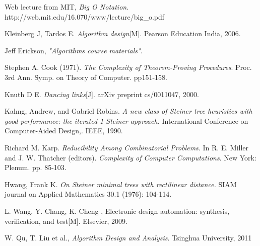 \documentclass[11pt,twoside, onecolumn]{IEEEtran}
\begin{document}
\begin{thebibliography}{1}

Web lecture from MIT, \emph{Big O Notation}. http://web.mit.edu/16.070/www/lecture/big\_o.pdf

Kleinberg J, Tardos E. \emph{Algorithm design}[M]. Pearson Education India, 2006.

Jeff Erickson, \emph{"Algorithms course materials"}.

Stephen A. Cook (1971). \emph{The Complexity of Theorem-Proving Procedures}. Proc. 3rd Ann. Symp. on Theory of Computer. pp151-158.

Knuth D E. \emph{Dancing links}[J]. arXiv preprint cs/0011047, 2000.


Kahng, Andrew, and Gabriel Robins. \emph{A new class of Steiner tree heuristics with good performance: the iterated 1-Steiner approach.}  International Conference on Computer-Aided Design,. IEEE, 1990.


Richard M. Karp. \emph{Reducibility Among Combinatorial Problems}. In R. E. Miller and J. W. Thatcher (editors). \emph{Complexity of Computer Computations}. New York: Plenum. pp. 85-103.


Hwang, Frank K. \emph{On Steiner minimal trees with rectilinear distance.} SIAM journal on Applied Mathematics 30.1 (1976): 104-114.


L. Wang, Y. Chang, K. Cheng , Electronic design automation: synthesis, verification, and test[M]. Elsevier, 2009.


W. Qu, T. Liu et al., \emph{Algorithm Design and Analysis}. Tsinghua University, 2011

\end{thebibliography}
\end{document}
